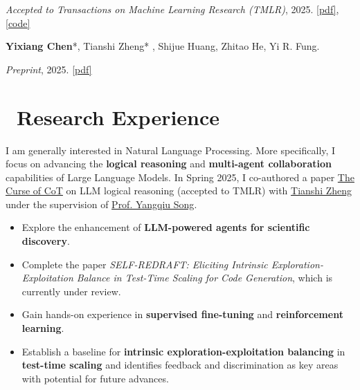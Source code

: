 \documentclass[colorlinks, linkcolor=blue]{resume}
\begin{document}
\textit{Accepted to Transactions on Machine Learning Research (TMLR)}, 2025. \href{https://arxiv.org/pdf/2504.05081}{[pdf]}, \href{https://github.com/HKUST-KnowComp/CoT-ICL-Eval}{[code]}


\textbf{Yixiang Chen}*, Tianshi Zheng* ,   Shijue Huang, Zhitao He, Yi R. Fung.

\textit{Preprint}, 2025. \href{https://www.arxiv.org/pdf/2511.02854}{[pdf]}

\section{\faUsers\ Research Experience}
I am generally interested in Natural Language Processing. More specifically, I focus on advancing the \textbf{logical reasoning} and \textbf{multi-agent collaboration} capabilities of Large Language Models. In Spring 2025, I co-authored a paper \href{https://arxiv.org/pdf/2504.05081}{The Curse of CoT} on LLM logical reasoning (accepted to TMLR) with \href{https://stonetzheng.github.io/}{Tianshi Zheng} under the supervision of \href{https://www.cse.ust.hk/~yqsong/}{Prof. Yangqiu Song}.
\begin{itemize}
    \item Explore the  enhancement of \textbf{LLM-powered agents for scientific discovery}.
\end{itemize}
\begin{itemize}
    \item Complete the paper \textit{SELF-REDRAFT: Eliciting Intrinsic Exploration-Exploitation Balance in Test-Time Scaling for Code Generation}, which is currently under review.
    \item Gain hands-on experience in \textbf{supervised fine-tuning} and \textbf{reinforcement learning}.
    \item Establish a baseline for \textbf{intrinsic exploration-exploitation balancing} in \textbf{test-time scaling} and identifies feedback and discrimination as key areas with potential for future advances.
\end{itemize}
\end{document}
